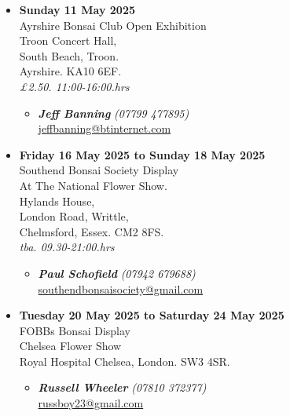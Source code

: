 \begin{itemize}
    \item \textbf{Sunday 11 May 2025}
    \\
    Ayrshire Bonsai Club Open Exhibition \\
    Troon Concert Hall, \\
    South Beach, Troon. \\
    Ayrshire. KA10 6EF.
    \\
    \emph{£2.50. 11:00-16:00.hrs}
    \begin{itemize}
        \item \textbf{\emph{Jeff Banning}} \emph{(07799 477895)} \\
        \href{mailto:jeffbanning@btinternet.com}{jeffbanning@btinternet.com} 
    \end{itemize}

    \item \textbf{Friday 16 May 2025 to Sunday 18 May 2025}
    \\
    Southend Bonsai Society Display \\
    At The National Flower Show. \\
    Hylands House, \\
    London Road, Writtle, \\
    Chelmsford, Essex. CM2 8FS.
    \\
    \emph{tba. 09.30-21:00.hrs}
    \begin{itemize}
        \item \textbf{\emph{Paul Schofield}} \emph{(07942 679688)} \\
        \href{mailto:southendbonsaisociety@gmail.com}{southendbonsaisociety@gmail.com} 
    \end{itemize}

    \item \textbf{Tuesday 20 May 2025 to Saturday 24 May 2025} \\
    FOBBs Bonsai Display \\
    Chelsea Flower Show  \\
    Royal Hospital Chelsea, London. SW3 4SR.
    \begin{itemize}
        \item \textbf{\emph{Russell Wheeler}} \emph{(07810 372377)} \\
        \href{mailto:russboy23@gmail.com}{russboy23@gmail.com} 
    \end{itemize}


\end{itemize}
